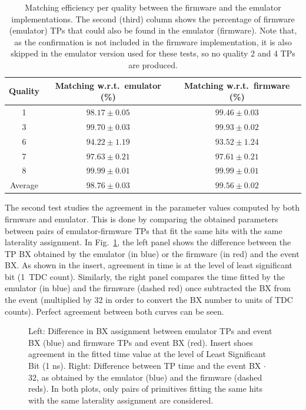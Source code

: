 \documentclass[../main.tex]{subfiles}
\begin{document}
\begin{table}[h!]
\begin{center}
\begin{tabular}{c | c | c}
Quality & Matching w.r.t.~emulator (\%) & Matching w.r.t.~firmware (\%) \\\hline
1       & $98.17 \pm 0.05$ & $99.46 \pm 0.03$ \\
3       & $99.70 \pm 0.03$ & $99.93 \pm 0.02$ \\ 
6       & $94.22 \pm 1.19$ & $93.52 \pm 1.24$ \\
7       & $97.63 \pm 0.21$ & $97.61 \pm 0.21$ \\
8       & $99.99 \pm 0.01$ & $99.99 \pm 0.01$ \\
Average & $98.76 \pm 0.03$ & $99.56 \pm 0.02$
\end{tabular}
\caption[Firmware-emulator matching efficiency per quality]{Matching efficiency per quality between the firmware and the emulator implementations. The second (third) column shows the percentage of firmware (emulator) TPs that could also be found in the emulator (firmware). Note that, as the confirmation is not included in the firmware implementation, it is also skipped in the emulator version used for these tests, so no quality 2 and 4 TPs are produced.}
\label{dts:tab:fwemu}
\end{center}
\end{table}

The second test studies the agreement in the parameter values computed by both firmware and emulator. This is done by comparing the obtained parameters between pairs of emulator-firmware TPs that fit the same hits with the same laterality assignment. In Fig.~\ref{dts:fig:fwemu_time}, the left panel shows the difference between the TP BX obtained by the emulator (in blue) or the firmware (in red) and the event BX. As shown in the insert, agreement in time is at the level of least significant bit (1~TDC count). Similarly, the right panel compares the time fitted by the emulator (in blue) and the firmware (dashed red) once subtracted the BX from the event (multiplied by 32 in order to convert the BX number to units of TDC counts). Perfect agreement between both curves can be seen.


\begin{figure}[h!]
\begin{center}
\end{center}
\caption[Firmware-emulator time differences]{Left: Difference in BX assignment between emulator TPs and event BX (blue) and firmware TPs and event BX (red). Insert shoes agreement in the fitted time value at the level of Least Significant Bit (1 ns). Right: Difference between TP time and the event BX $\cdot$ 32, as obtained by the emulator (blue) and the firmware (dashed reds). In both plots, only pairs of primitives fitting the same hits with the same laterality assignment are considered.}
\label{dts:fig:fwemu_time}
\end{figure}
\end{document}

